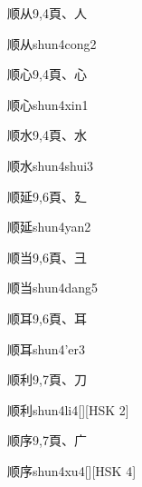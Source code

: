 \begin{entry}{顺从}{9,4}{⾴、⼈}
  \begin{phonetics}{顺从}{shun4cong2}
  \end{phonetics}
\end{entry}

\begin{entry}{顺心}{9,4}{⾴、⼼}
  \begin{phonetics}{顺心}{shun4xin1}
  \end{phonetics}
\end{entry}

\begin{entry}{顺水}{9,4}{⾴、⽔}
  \begin{phonetics}{顺水}{shun4shui3}
  \end{phonetics}
\end{entry}

\begin{entry}{顺延}{9,6}{⾴、⼵}
  \begin{phonetics}{顺延}{shun4yan2}
  \end{phonetics}
\end{entry}

\begin{entry}{顺当}{9,6}{⾴、⼹}
  \begin{phonetics}{顺当}{shun4dang5}
  \end{phonetics}
\end{entry}

\begin{entry}{顺耳}{9,6}{⾴、⽿}
  \begin{phonetics}{顺耳}{shun4'er3}
  \end{phonetics}
\end{entry}

\begin{entry}{顺利}{9,7}{⾴、⼑}
  \begin{phonetics}{顺利}{shun4li4}[][HSK 2]
  \end{phonetics}
\end{entry}

\begin{entry}{顺序}{9,7}{⾴、⼴}
  \begin{phonetics}{顺序}{shun4xu4}[][HSK 4]
  \end{phonetics}
\end{entry}


